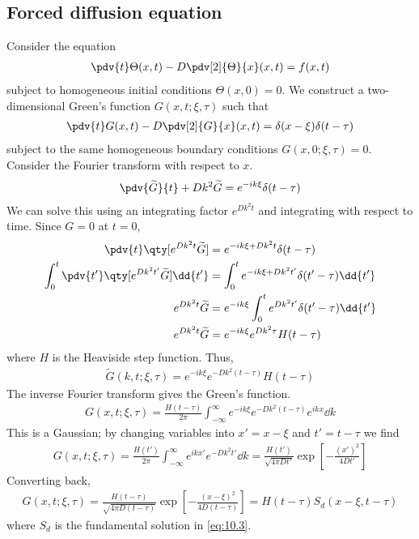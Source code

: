 \subsection{Forced diffusion equation}
Consider the equation
\begin{align} \label{eq:10.6}
	\pdv{t}\Theta(x,t) - D \pdv[2]{\Theta}{x}(x,t) = f(x,t)
\end{align}
subject to homogeneous initial conditions $\Theta(x,0) = 0$.
We construct a two-dimensional Green's function $G(x,t; \xi, \tau)$ such that
\begin{align} \label{eq:10.7}
	\pdv{t}G(x,t) - D \pdv[2]{G}{x}(x,t) = \delta(x - \xi)\delta(t - \tau)
\end{align}
subject to the same homogeneous boundary conditions $G(x,0;\xi,\tau) = 0$.
Consider the Fourier transform with respect to $x$.
\begin{align*}
	\pdv{\widetilde G}{t} + D k^2 \widetilde G = e^{-ik\xi} \delta(t - \tau)
\end{align*}
We can solve this using an integrating factor $e^{Dk^2 t}$ and integrating with respect to time.
Since $G = 0$ at $t = 0$,
\begin{align*}
	\pdv{t} \qty[ e^{D k^2 t} \widetilde G ] &= e^{-ik\xi + D k^2 t} \delta(t - \tau) \\
	\int_0^t \pdv{t'} \qty[ e^{D k^2 t'} \widetilde G ] \dd{t'} & = \int_0^t e^{-ik\xi + D k^2 t'} \delta(t' - \tau) \dd{t'} \\
	e^{D k^2 t} \widetilde G &= e^{-ik\xi} \int_0^t e^{D k^2 t'} \delta(t' - \tau) \dd{t'} \\
	e^{D k^2 t} \widetilde G &= e^{-ik\xi} e^{D k^2 \tau} H(t - \tau)
\end{align*}
where $H$ is the Heaviside step function.
Thus,
\begin{align*}
	\widetilde G(k,t;\xi,\tau) = e^{-ik\xi} e^{-D k^2 (t - \tau)} H(t - \tau)
\end{align*}
The inverse Fourier transform gives the Green's function.
\begin{align*}
	G(x,t;\xi,\tau) = \frac{H(t - \tau)}{2\pi} \int_{-\infty}^\infty e^{-ik\xi} e^{-D k^2 (t - \tau)} e^{ikx} \dd{k}
\end{align*}
This is a Gaussian; by changing variables into $x' = x - \xi$ and $t' = t - \tau$ we find
\begin{align*}
	G(x,t;\xi,\tau) = \frac{H(t')}{2\pi} \int_{-\infty}^\infty e^{ikx'} e^{-D k^2 t'} \dd{k} = \frac{H(t')}{\sqrt{4 \pi D t'}} \exp[-\frac{(x')^2}{4Dt'}]
\end{align*}
Converting back,
\begin{align} \label{eq:10.8}
	G(x,t;\xi,\tau) = \frac{H(t - \tau)}{\sqrt{4 \pi D (t - \tau)}} \exp[-\frac{(x - \xi)^2}{4D(t - \tau)}] = H(t-\tau) S_d(x-\xi, t-\tau)
\end{align}
where $S_d$ is the fundamental solution in \cref{eq:10.3}.

